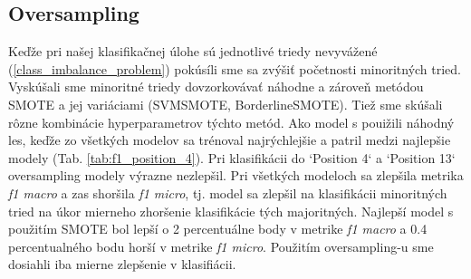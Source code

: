 \documentclass[runningheads]{llncs}
\begin{document}
\subsection{Oversampling}

Keďže pri našej klasifikačnej úlohe sú jednotlivé triedy nevyvážené (\ref{class_imbalance_problem}) pokúsíli sme sa zvýšiť početnosti minoritných tried. Vyskúšali sme minoritné triedy dovzorkovávať náhodne a zároveň metódou SMOTE a jej variáciami (SVMSMOTE, BorderlineSMOTE). Tiež sme skúšali rôzne kombinácie hyperparametrov týchto metód.
Ako model s pouižili náhodný les, keďže zo všetkých modelov sa trénoval najrýchlejšie a patril medzi najlepšie modely (Tab. \ref{tab:f1_position_4}). Pri klasifikácii do `Position 4` a `Position 13` oversampling modely výrazne nezlepšil.
Pri všetkých modeloch sa zlepšila metrika \textit{f1 macro} a zas shoršila \textit{f1 micro}, tj. model sa zlepšil na klasifikácii minoritných tried na úkor mierneho zhoršenie klasifikácie tých majoritných.
Najlepší model s použitím SMOTE bol lepší o 2 percentuálne body v metrike \textit{f1 macro} a 0.4 percentualného bodu horší v metrike \textit{f1 micro}.
Použitím oversampling-u sme dosiahli iba mierne zlepšenie v klasifiácii.



\end{document}
